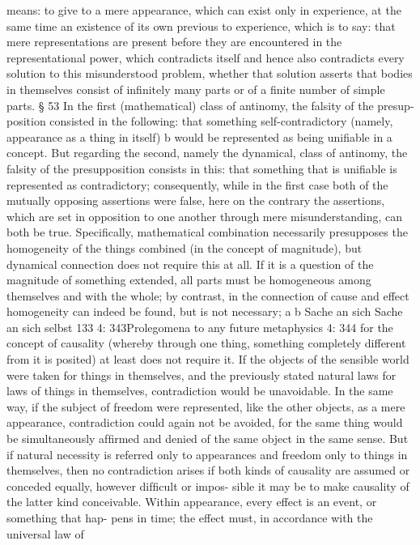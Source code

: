 means: to give to a mere appearance, which can exist only in experience,
at the same time an existence of its own previous to experience, which is to
say: that mere representations are present before they are encountered
in the representational power, which contradicts itself and hence also
contradicts every solution to this misunderstood problem, whether that
solution asserts that bodies in themselves consist of inﬁnitely many parts
or of a ﬁnite number of simple parts.
§ 53
In the ﬁrst (mathematical) class of antinomy, the falsity of the presup-
position consisted in the following: that something self-contradictory
(namely, appearance as a thing in itself) b would be represented as being
uniﬁable in a concept. But regarding the second, namely the dynamical,
class of antinomy, the falsity of the presupposition consists in this: that
something that is uniﬁable is represented as contradictory; consequently,
while in the ﬁrst case both of the mutually opposing assertions were false,
here on the contrary the assertions, which are set in opposition to one
another through mere misunderstanding, can both be true.
Speciﬁcally, mathematical combination necessarily presupposes the
homogeneity of the things combined (in the concept of magnitude), but
dynamical connection does not require this at all. If it is a question of
the magnitude of something extended, all parts must be homogeneous
among themselves and with the whole; by contrast, in the connection of
cause and effect homogeneity can indeed be found, but is not necessary;
a
b
Sache an sich
Sache an sich selbst
133
4: 343Prolegomena to any future metaphysics
4: 344
for the concept of causality (whereby through one thing, something
completely different from it is posited) at least does not require it.
If the objects of the sensible world were taken for things in themselves,
and the previously stated natural laws for laws of things in themselves,
contradiction would be unavoidable. In the same way, if the subject of
freedom were represented, like the other objects, as a mere appearance,
contradiction could again not be avoided, for the same thing would be
simultaneously afﬁrmed and denied of the same object in the same sense.
But if natural necessity is referred only to appearances and freedom only
to things in themselves, then no contradiction arises if both kinds of
causality are assumed or conceded equally, however difﬁcult or impos-
sible it may be to make causality of the latter kind conceivable.
Within appearance, every effect is an event, or something that hap-
pens in time; the effect must, in accordance with the universal law of
